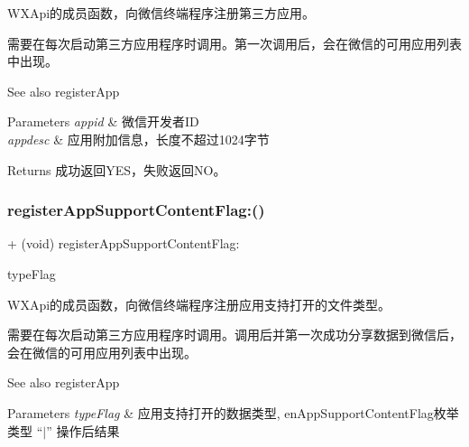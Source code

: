 W\+X\+Api的成员函数，向微信终端程序注册第三方应用。 

需要在每次启动第三方应用程序时调用。第一次调用后，会在微信的可用应用列表中出现。 \begin{DoxySeeAlso}{See also}
register\+App 
\end{DoxySeeAlso}

\begin{DoxyParams}{Parameters}
{\em appid} & 微信开发者\+ID \\
\hline
{\em appdesc} & 应用附加信息，长度不超过1024字节 \\
\hline
\end{DoxyParams}
\begin{DoxyReturn}{Returns}
成功返回\+Y\+E\+S，失败返回\+N\+O。 
\end{DoxyReturn}
\mbox{\label{interface_w_x_api_a3a8dd85dbe67ae84d4c75d674d781c9b}} 
\subsubsection{\texorpdfstring{register\+App\+Support\+Content\+Flag\+:()}{registerAppSupportContentFlag:()}\hspace{0.1cm}{\footnotesize\ttfamily [1/3]}}
{\footnotesize\ttfamily + (void) register\+App\+Support\+Content\+Flag\+: \begin{DoxyParamCaption}\item[{(U\+Int64)}]{type\+Flag }\end{DoxyParamCaption}}



W\+X\+Api的成员函数，向微信终端程序注册应用支持打开的文件类型。 

需要在每次启动第三方应用程序时调用。调用后并第一次成功分享数据到微信后，会在微信的可用应用列表中出现。 \begin{DoxySeeAlso}{See also}
register\+App 
\end{DoxySeeAlso}

\begin{DoxyParams}{Parameters}
{\em type\+Flag} & 应用支持打开的数据类型, en\+App\+Support\+Content\+Flag枚举类型 “$\vert$” 操作后结果 \\
\hline
\end{DoxyParams}
\mbox{\label{interface_w_x_api_a3a8dd85dbe67ae84d4c75d674d781c9b}} 
